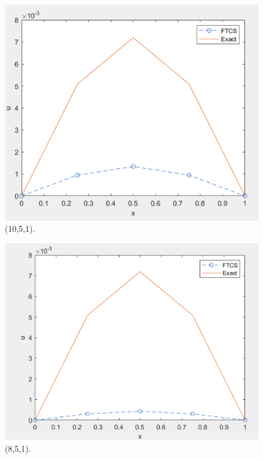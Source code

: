 \documentclass[letterpaper, 10 pt, conference]{ieeeconf}
\begin{document}
\begin{figure}[htbp]
\centering
\includegraphics[width=0.97\columnwidth]{Figuras/mat3.png}
\caption{(10,5,1).}
\label{stability}
\end{figure}
\begin{figure}[htbp]
\centering
\includegraphics[width=0.97\columnwidth]{Figuras/mat4.png}
\caption{(8,5,1).}
\label{stability}
\end{figure}
\end{document}
